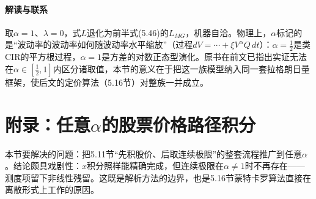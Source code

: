 \paragraph{解读与联系}
取$\alpha=1$、$\lambda=0$，式$L$退化为前半式(5.46)的$L_{MG}$，机器自洽。物理上，$\alpha$标记的是“波动率的波动率如何随波动率水平缩放”（过程$dV=\cdots+\xi V^{\alpha}Q\,dt$）：$\alpha=\frac{1}{2}$是类CIR的平方根过程，$\alpha=1$是方差的对数正态型演化。原书在前文已指出实证无法在$\alpha\in[\frac{1}{2},1]$内区分诸取值，本节的意义在于把这一族模型纳入同一套拉格朗日量框架，使后文的定价算法（5.16节）对整族一并成立。

\section{附录：任意$\alpha$的股票价格路径积分}

本节要解决的问题：把5.11节“先积股价、后取连续极限”的整套流程推广到任意$\alpha$。结论颇具戏剧性：$x$积分照样能精确完成，但连续极限在$\alpha\neq1$时不再存在——测度项留下非线性残留。这既是解析方法的边界，也是5.16节蒙特卡罗算法直接在离散形式上工作的原因。

